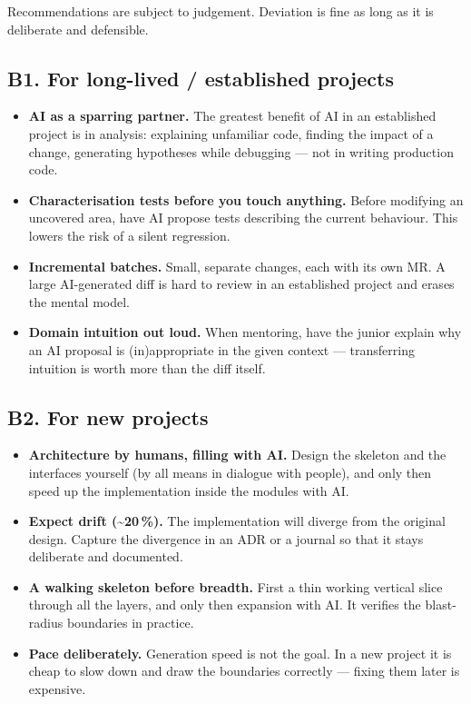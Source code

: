 Recommendations are subject to judgement.
Deviation is fine as long as it is deliberate and defensible.

\subsection{B1. For long-lived / established projects}

\begin{itemize}
\item \textbf{AI as a sparring partner.}
The greatest benefit of AI in an established project is in analysis: explaining unfamiliar code, finding the impact of a change, generating hypotheses while debugging --- not in writing production code.
\item \textbf{Characterisation tests before you touch anything.}
Before modifying an uncovered area, have AI propose tests describing the current behaviour.
This lowers the risk of a silent regression.
\item \textbf{Incremental batches.}
Small, separate changes, each with its own MR.
A large AI-generated diff is hard to review in an established project and erases the mental model.
\item \textbf{Domain intuition out loud.}
When mentoring, have the junior explain why an AI proposal is (in)appropriate in the given context --- transferring intuition is worth more than the diff itself.
\end{itemize}

\subsection{B2. For new projects}

\begin{itemize}
\item \textbf{Architecture by humans, filling with AI.}
Design the skeleton and the interfaces yourself (by all means in dialogue with people), and only then speed up the implementation inside the modules with AI.
\item \textbf{Expect drift (\textasciitilde20\,\%).}
The implementation will diverge from the original design.
Capture the divergence in an ADR or a journal so that it stays deliberate and documented.
\item \textbf{A walking skeleton before breadth.}
First a thin working vertical slice through all the layers, and only then expansion with AI.
It verifies the blast-radius boundaries in practice.
\item \textbf{Pace deliberately.}
Generation speed is not the goal.
In a new project it is cheap to slow down and draw the boundaries correctly --- fixing them later is expensive.
\end{itemize}


